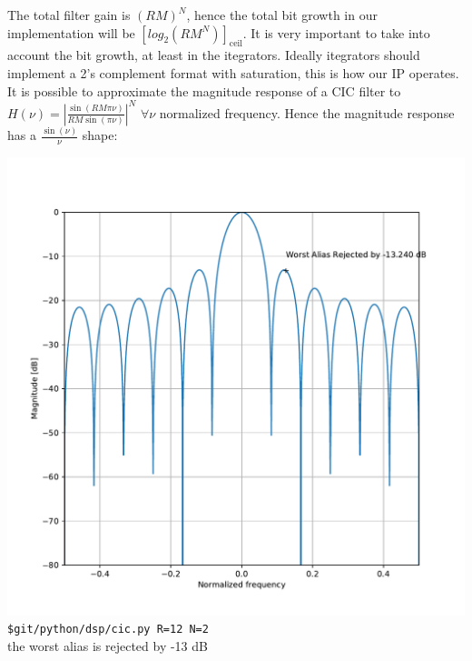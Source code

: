 \documentclass{article}
\begin{document}
The total filter gain is $(RM)^N$,
hence the total bit growth in our implementation
will be $\left[ log_2\left(RM^N\right) \right]_\text{ceil}$.
It is very important to take into account the bit growth, at least in the
itegrators. Ideally itegrators should implement a 2's complement format
with saturation, this is how our IP operates. \\

It is possible to approximate the magnitude response 
of a CIC filter to
$H(\nu) = \left| \frac{\sin(R M \pi \nu)}{R M \sin(\pi \nu)} \right|^N$
$\forall \nu$ normalized frequency. 
Hence the magnitude response has a $\frac{\sin(\nu)}{\nu}$ shape:

\begin{center}
	\begin{minipage}{0.40\linewidth}
		\includegraphics[width=0.99\linewidth]{cic_r12_n2.pdf} \\
		{\tt \$git/python/dsp/cic.py R=12 N=2} \\
		the worst alias is rejected by -13 dB
	\end{minipage}
	\begin{minipage}{0.40\linewidth}

\end{minipage}
\end{center}
\end{document}

